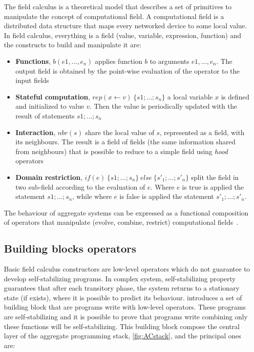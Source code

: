 The field calculus is a theoretical model that describes a set of primitives to manipulate the concept of computational field. A computational field is a distributed data structure that maps every networked device to some local value. In field calculus, everything is a field (value, variable, expression, function) and the constructs to build and manipulate it are:
\begin{itemize}
    \item \textbf{Functions}, $b(e1,\dots,e_n)$ applies function $b$ to arguments $e1,\dots,e_n$. The output field is obtained by the point-wise evaluation of the operator to the input fields
    \item \textbf{Stateful computation}, $rep(x \leftarrow v)~\{s1; \dots ; s_n\}$ a local variable $x$ is defined and initialized to value $v$. Then the value is periodically updated with the result of statements $s1; \dots ; s_n$
    \item \textbf{Interaction}, $nbr(s)$ share the local value of $s$, represented as a field, with its neighbours. The result is a field of fields (the same information shared from neighbours) that is possible to reduce to a simple field using \textit{hood} operators
    \item \textbf{Domain restriction}, $if(e)~\{s1; \dots ; s_n\}~else~\{s'_1; \dots ; s'_n\}$ split the field in two sub-field according to the evaluation of $e$. Where $e$ is true is applied the statement $s1; \dots ; s_n$, while where $e$ is false is applied the statement $s'_1; \dots ; s'_n$.
\end{itemize}

The behaviour of aggregate systems can be expressed as a functional composition of operators that manipulate (evolve, combine, restrict) computational fields~\cite{type-sound}.

\subsection{Building blocks operators}
Basic field calculus constructors are low-level operators which do not guarantee to develop self-stabilizing programs. 
In complex system, self-stabilizing property guarantees that after each transitory phase, the system returns to a stationary state (if exists), where it is possible to predict its behaviour. 
\cite{buildingBlock} introduces a set of building block that are programs write with low-level operators.
These programs are self-stabilizing and it is possible to prove that programs write combining only these functions will be self-stabilizing.
This building block compose the central layer of the aggregate programming stack, \autoref{fig:ACstack}, and the principal ones are:

